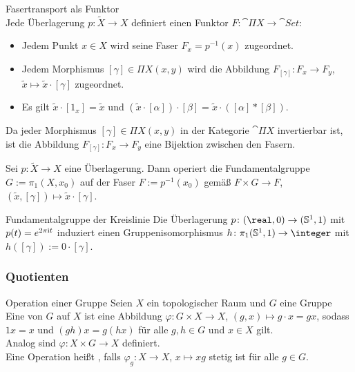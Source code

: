 \begin{Satz}{Fasertransport als Funktor}\\
    Jede Überlagerung $p\colon \widetilde{X} \rightarrow X$ definiert einen
    Funktor $F\colon \cat{\Pi X} \rightarrow \cat{Set}$:
    \begin{itemize}
        \item
        Jedem Punkt $x \in X$ wird seine Faser $F_x = p^{-1}(x)$ zugeordnet.
        
        \item
        Jedem Morphismus $[\gamma] \in \Pi X(x, y)$ wird die Abbildung
        $F_{[\gamma]}\colon F_x \rightarrow F_y$,
        $\widetilde{x} \mapsto \widetilde{x} \cdot [\gamma]$ zugeordnet.
        
        \item
        Es gilt $\widetilde{x} \cdot [1_x] = \widetilde{x}$ und
        $(\widetilde{x} \cdot [\alpha]) \cdot [\beta] =
        \widetilde{x} \cdot ([\alpha] \ast [\beta])$.
    \end{itemize}
    Da jeder Morphismus $[\gamma] \in \Pi X(x, y)$ in der Kategorie
    $\cat{\Pi X}$ invertierbar ist, ist die Abbildung
    $F_{[\gamma]}\colon F_x \rightarrow F_y$
    eine Bijektion zwischen den Fasern.
\end{Satz}

\begin{Kor}
    Sei $p\colon \widetilde{X} \rightarrow X$ eine Überlagerung.
    Dann operiert die Fundamentalgruppe \\
    $G := \pi_1(X, x_0)$ auf der
    Faser $F := p^{-1}(x_0)$ gemäß $F \times G \rightarrow F$,
    $(\widetilde{x}, [\gamma]) \mapsto \widetilde{x} \cdot [\gamma]$.
\end{Kor}

\linie

\begin{Satz}{Fundamentalgruppe der Kreislinie}
    Die Überlagerung $p\colon (\real, 0) \rightarrow (\sphere^1, 1)$ mit
    $p(t) = e^{2\pi\mathrm{i} t}$ induziert einen Gruppenisomorphismus
    $h\colon \pi_1(\sphere^1, 1) \rightarrow \integer$ mit
    $h([\gamma]) := 0 \cdot [\gamma]$.
\end{Satz}

\pagebreak

\subsubsection{%
    Quotienten%
}

\begin{Def}{Operation einer Gruppe}
    Seien $X$ ein topologischer Raum und $G$ eine Gruppe
    Eine  von $G$ auf $X$ ist eine Abbildung
    $\varphi\colon G \times X \rightarrow X$, $(g, x) \mapsto g \cdot x = gx$,
    sodass $1x = x$ und $(gh)x = g(hx)$ für alle $g, h \in G$ und $x \in X$
    gilt. \\
    Analog sind 
    $\varphi\colon X \times G \rightarrow X$ definiert. \\
    Eine Operation heißt , falls
    $\varphi_g\colon X \rightarrow X$, $x \mapsto xg$ stetig ist
    für alle $g \in G$.
\end{Def}

